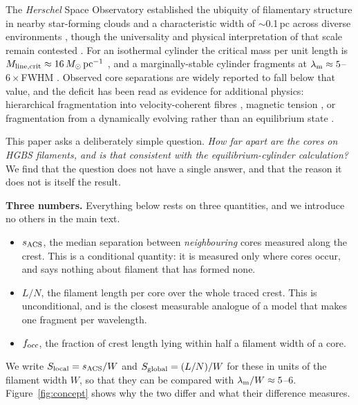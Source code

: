 \documentclass[usenatbib,twoside,twocolumn]{mnras}
\begin{document}
The \textit{Herschel} Space Observatory established the ubiquity of filamentary structure in nearby star-forming clouds \citep{Andre2010} and a characteristic width of $\sim$0.1\,pc across diverse environments \citep{Arzoumanian2011}, though the universality and physical interpretation of that scale remain contested \citep{Panopoulou2017,Panopoulou2022}. For an isothermal cylinder the critical mass per unit length is $M_{\rm line,crit}\approx16\,M_\odot\,{\rm pc^{-1}}$ \citep{Ostriker1964}, and a marginally-stable cylinder fragments at $\lambda_{\rm m}\approx5$--$6\times$FWHM \citep{Inutsuka1992,Fischera2012}. Observed core separations are widely reported to fall below that value, and the deficit has been read as evidence for additional physics: hierarchical fragmentation into velocity-coherent fibres \citep{Hacar2013,Hacar2018,Yang2024}, magnetic tension \citep{Nakamura1993}, or fragmentation from a dynamically evolving rather than an equilibrium state \citep{Andre2014,Clarke2016,Clarke2017,Clarke2020}.

This paper asks a deliberately simple question. \emph{How far apart are the cores on HGBS filaments, and is that consistent with the equilibrium-cylinder calculation?} We find that the question does not have a single answer, and that the reason it does not is itself the result.

\smallskip\noindent\textbf{Three numbers.} Everything below rests on three quantities, and we introduce no others in the main text.
\begin{itemize}\setlength{\itemsep}{1pt}
\item $s_{\rm ACS}$, the median separation between \emph{neighbouring} cores measured along the crest. This is a conditional quantity: it is measured only where cores occur, and says nothing about filament that has formed none.
\item $L/N$, the filament length per core over the whole traced crest. This is unconditional, and is the closest measurable analogue of a model that makes one fragment per wavelength.
\item $f_{\rm occ}$, the fraction of crest length lying within half a filament width of a core.
\end{itemize}
We write $S_{\rm local}=s_{\rm ACS}/W$ and $S_{\rm global}=(L/N)/W$ for these in units of the filament width $W$, so that they can be compared with $\lambda_{\rm m}/W\approx5$--$6$. Figure~\ref{fig:concept} shows why the two differ and what their difference measures.
\end{document}
